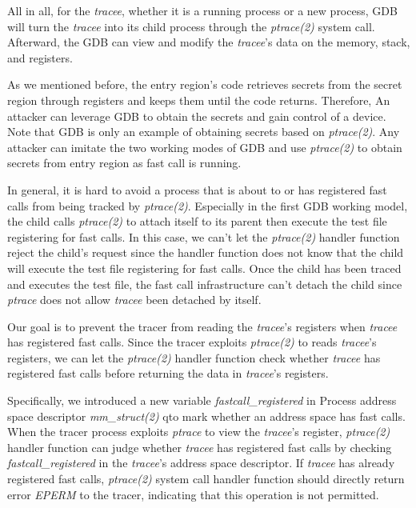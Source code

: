 All in all, for the \emph{tracee}, whether it is a running process or 
a new process, GDB will turn the \emph{tracee} into its child process 
through the \emph{ptrace(2)} system call. Afterward, the GDB can view and modify 
the \emph{tracee}'s data on the memory, stack, and registers.

As we mentioned before, the entry region's code retrieves secrets 
from the secret region through registers and keeps them until the code 
returns. Therefore, An attacker can leverage GDB  to obtain the secrets 
and gain control of a device.  Note that GDB is only an example of obtaining 
secrets based on \emph{ptrace(2)}. Any attacker can imitate the two working modes of 
GDB and use \emph{ptrace(2)} to obtain secrets from entry region as fast call is running.

In general, it is hard to avoid a process that is about to or has 
registered fast calls from being tracked by \emph{ptrace(2)}. Especially in the 
first GDB  working model, the child calls \emph{ptrace(2)} to attach itself 
to its parent then execute the test file registering for fast calls. 
In this case, we can't let the \emph{ptrace(2)} handler function reject the 
child's request since the handler function does not know that 
the child will execute the test file registering for fast calls. 
Once the child has been traced and executes the test file, the fast 
call infrastructure can't detach the child since \emph{ptrace} does not allow 
\emph{tracee} been detached by itself.

Our goal is to prevent the tracer from reading the 
\emph{tracee}'s registers when \emph{tracee} has registered fast calls. 
Since the tracer exploits \emph{ptrace(2)} to reads \emph{tracee}'s registers, 
we can let the \emph{ptrace(2)} handler function check whether \emph{tracee} has 
registered fast calls before returning the data in \emph{tracee}'s registers.


Specifically, we introduced a new variable \emph{fastcall\_registered} 
in Process address space descriptor \emph{mm\_struct(2)} qto mark whether an
address space has fast calls. When the tracer process exploits \emph{ptrace} 
to view the \emph{tracee}'s register, \emph{ptrace(2)} handler function can judge whether
\emph{tracee} has registered fast calls by checking \emph{fastcall\_registered} in 
the \emph{tracee}'s address space descriptor. If \emph{tracee} has already 
registered fast calls, \emph{ptrace(2)} system call handler function should 
directly return error \emph{EPERM} to the tracer, indicating that this 
operation is not permitted.

